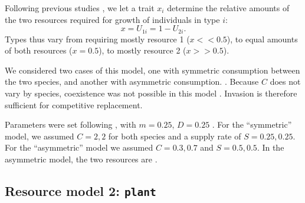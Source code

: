 \documentclass[a4paper,11pt]{article}
\newcommand{\verify}[1]{{\color{navy}{(verify: #1)}}}
\newcommand{\plant}{{\tt plant}}
\begin{document}
Following previous studies \citep{Tilman-1985, Schreiber-2003, Fox-2008}, we let a trait $x_i$ determine the relative amounts of the two resources required for growth of individuals in type $i$: \begin{equation}
\label{eq:R3}
x = U_{1i} = 1 - U_{2i}.
\end{equation}
Types thus vary from requiring mostly resource 1 ($x << 0.5$), to equal amounts of both resources ($x = 0.5$), to mostly resource 2 ($x >> 0.5$).

We considered two cases of this model, one with symmetric consumption \verify{(GJK) or content?} between the two species, and another with asymmetric consumption. \verify{(GJK) What does this mean? Is it symmetric across species or with respect to resources?}. \verify{(GJK) Are symmetric and asymmetric cases both important?} Because $C$ does not vary by species, coexistence was not possible in this model \citep{Tilman-1982}. Invasion is therefore sufficient for competitive replacement.

Parameters were set following \citet{Fox-2008}, with $m = 0.25$, $D=0.25$ \verify{(GJK) true? Need to update parameters if model has been changed?}. For the ``symmetric'' model, we assumed $C = {2, 2}$ for both species and a supply rate of  $S = {0.25, 0.25}$.  For the ``asymmetric'' model we assumed $C = {0.3, 0.7}$ and $S = {0.5, 0.5}$. In the asymmetric model, the two resources are \verify{(GJK) consumed at a different by each species}.

\subsection{Resource model 2: \plant }
\end{document}
